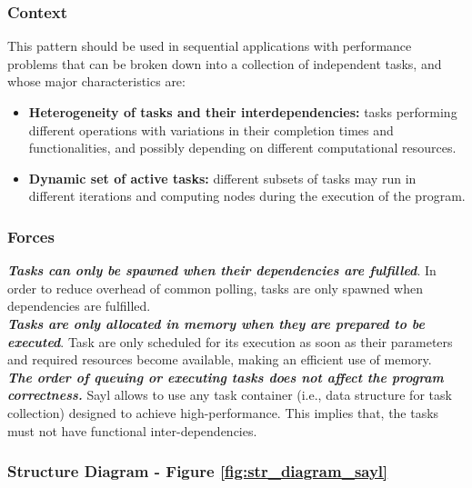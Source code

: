\subsubsection{Context}

This pattern should be used in sequential applications with performance problems that can be broken down into a collection of independent tasks, and whose major characteristics are:

\begin{itemize}
	\item  \textbf{Heterogeneity of tasks and their interdependencies:} tasks performing different operations with variations in their completion times and functionalities, and possibly depending on different computational resources.
	
	\item  \textbf{Dynamic set of active tasks: }different subsets of tasks may run in different iterations and computing nodes during the execution of the program.
\end{itemize}


\subsubsection{Forces}

\noindent\textbf{\textit{Tasks can only be spawned when their dependencies are fulfilled}}. In order to reduce overhead of common polling, tasks are only spawned when dependencies are fulfilled. \\

\noindent\textbf{\textit{Tasks are only allocated in memory when they are prepared to be executed}}. Task are only scheduled for its execution as soon as their parameters and required resources become available, making an efficient use of memory.\\

\noindent\textbf{\textit{The order of queuing or executing tasks does not affect the program correctness.}} Sayl allows to use any task container (i.e., data structure for task collection) designed to achieve high-performance. This implies that, the tasks must not have functional inter-dependencies.

\subsubsection{Structure Diagram - Figure \ref{fig:str_diagram_sayl}}

